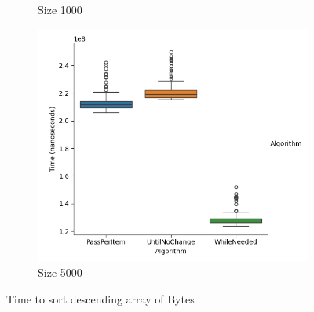 \documentclass{article}
\begin{document}
\begin{figure}[ht]
\begin{subfigure}{0.3\textwidth}
    \caption{Size 1000}
    \label{fig:img2}
  \end{subfigure}
  \begin{subfigure}{0.3\textwidth}
    \centering
    \includegraphics[width=\linewidth]{../figureByteDesc5000.png}
    \caption{Size 5000}
    \label{fig:img3}
  \end{subfigure}
  \caption{Time to sort descending array of Bytes}
  \label{fig:three_images}
\end{figure}
\end{document}
